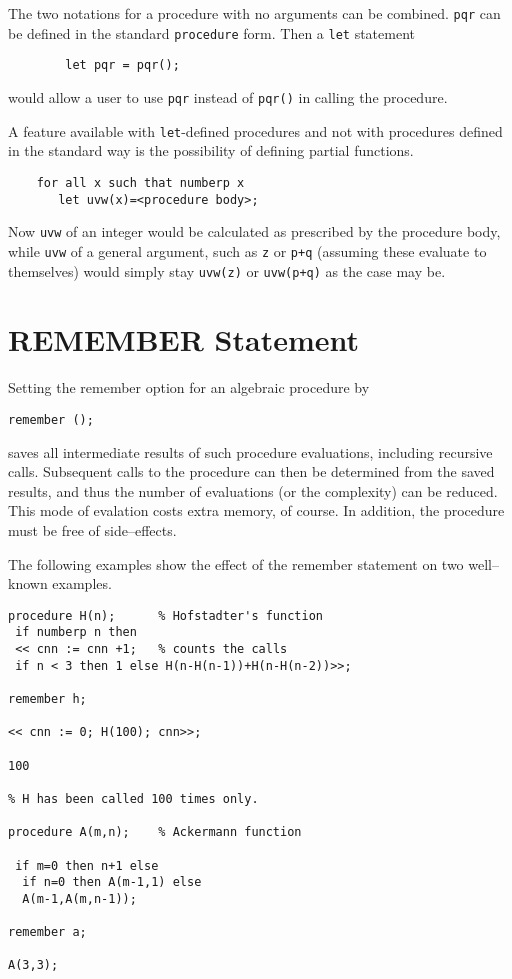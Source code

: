 The two notations for a procedure with no arguments can be combined. \texttt{pqr}
can be defined in the standard \texttt{procedure} form. Then a \texttt{let}
statement
\begin{verbatim}
        let pqr = pqr();
\end{verbatim}
would allow a user to use \texttt{pqr} instead of \texttt{pqr()} in calling the
procedure.

A feature available with \texttt{let}-defined procedures and not with procedures
defined in the standard way is the possibility of defining partial
functions.
\begin{verbatim}
    for all x such that numberp x
       let uvw(x)=<procedure body>;
\end{verbatim}
Now \texttt{uvw} of an integer would be calculated as prescribed by the procedure
body, while \texttt{uvw} of a general argument, such as \texttt{z} or \texttt{p+q}
(assuming these evaluate to themselves) would simply stay \texttt{uvw(z)}
or \texttt{uvw(p+q)} as the case may be.


\section{REMEMBER Statement}
\hypertarget{command:REMEMBER}{}

Setting the remember option for an algebraic procedure by
\begin{syntax}
     \texttt{remember (}\texttt{);}
\end{syntax}
saves all intermediate results of such procedure evaluations, including
recursive calls.  Subsequent calls to the procedure can then be determined
from the saved results, and thus the number of evaluations (or the
complexity) can be reduced.  This mode of evalation costs extra memory, of
course.  In addition, the procedure must be free of side--effects.

The following examples show the effect of the remember statement
on two well--known examples.

\begin{samepage}
\begin{verbatim}
procedure H(n);      % Hofstadter's function
 if numberp n then
 << cnn := cnn +1;   % counts the calls
 if n < 3 then 1 else H(n-H(n-1))+H(n-H(n-2))>>;

remember h;

<< cnn := 0; H(100); cnn>>;

100

% H has been called 100 times only.

procedure A(m,n);    % Ackermann function

 if m=0 then n+1 else
  if n=0 then A(m-1,1) else
  A(m-1,A(m,n-1));

remember a;

A(3,3);

\end{verbatim}
\end{samepage}
